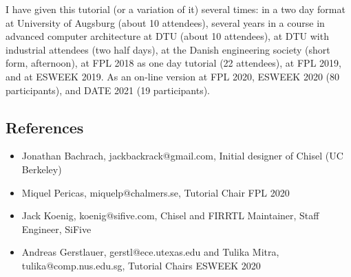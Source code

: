 \documentclass{article}
\begin{document}


I have given this tutorial (or a variation of it) several times:
in a two day format at University of Augsburg (about 10 attendees), several years
in a course in advanced computer architecture at DTU (about 10 attendees), at DTU with industrial attendees
(two half days), at the Danish engineering society (short form, afternoon),
at FPL 2018 as one day tutorial (22 attendees), at FPL 2019, and at ESWEEK 2019.
As an on-line version at FPL 2020, ESWEEK 2020 (80 participants), and DATE 2021 (19 participants).


\subsection*{References}

\begin{itemize}
\item Jonathan Bachrach, jackbackrack@gmail.com, Initial designer of Chisel (UC Berkeley)
\item Miquel Pericas, miquelp@chalmers.se, Tutorial Chair FPL 2020
\item Jack Koenig, koenig@sifive.com, Chisel and FIRRTL Maintainer, Staff Engineer, SiFive
\item Andreas Gerstlauer, gerstl@ece.utexas.edu and Tulika Mitra, tulika@comp.nus.edu.sg, Tutorial Chairs ESWEEK 2020
\end{itemize}
\end{document}
